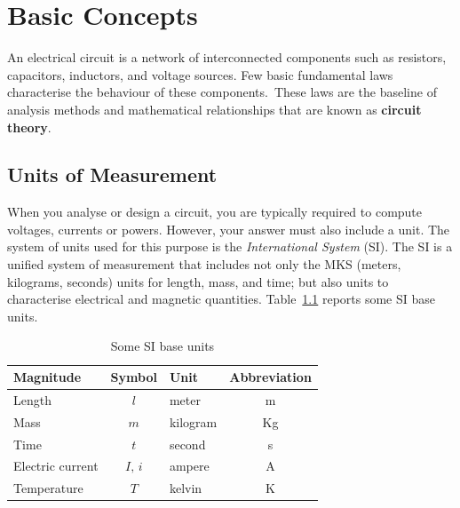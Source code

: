 \chapter{Basic Concepts}

\begin{summary}
  An electrical circuit is a network of interconnected components such as resistors, capacitors, inductors, and voltage sources. Few basic fundamental laws characterise the behaviour of these components. These laws are the baseline of analysis methods and mathematical relationships that are known as \textbf{circuit theory}.
\end{summary}

\section{Units of Measurement}
When you analyse or design a circuit, you are typically required to compute voltages, currents or powers. However, your answer must also include a unit. The system of units used for this purpose is the \emph{International System} (SI). The SI is a unified system of measurement that includes not only the MKS (meters, kilograms, seconds) units for length, mass, and time; but also units to characterise electrical and magnetic quantities. Table~\ref{tb:si_base} reports some SI base units.

\begin{table}[h!]
  \centering
  \begin{tabular}{ l  c  l  c }
  \textbf{Magnitude} & \textbf{Symbol} & \textbf{Unit} & \textbf{Abbreviation} \\
  \hline
  Length & $l$ & meter & m \\
  Mass & $m$ & kilogram & Kg \\
  Time & $t$ & second & s \\
  Electric current & $I,\,i$ & ampere & A \\
  Temperature & $T$ & kelvin & K \\
  \end{tabular}
  \caption{Some SI base units}
  \label{tb:si_base}
\end{table}

